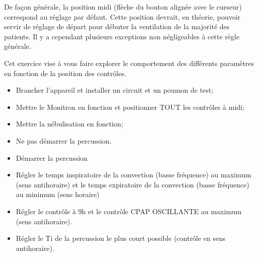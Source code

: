 \def\qpmoy{%
	Quelle est la pression (moyenne globale ou inspiratoire) affichée sur le multimètre?
	\shortanswer[\cmh]%
	}

\begin{exercice}
De façon générale, la position midi (flèche du bouton alignée avec le curseur) correspond au réglage par défaut. Cette position devrait, en théorie,  pouvoir servir de réglage de départ pour débuter la ventilation de la majorité des patients. Il y a cependant plusieurs exceptions non négligeables à cette règle générale.

Cet exercice vise à vous faire explorer le comportement des différents paramètres en fonction de la position des contrôles.

\begin{itemize}
	\item Brancher l'appareil et installer un circuit et un poumon de test;
	\item Mettre le Monitron en fonction et positionner TOUT les contrôles à midi;
	\item Mettre la nébulisation en fonction;
	\item Ne pas démarrer la percussion.
\end{itemize}




	\begin{itemize}
		\item Démarrer la percussion
		\item Régler le temps inspiratoire de la convection (basse fréquence) au maximum (sens antihoraire) et le temps expiratoire de la convection (basse fréquence) au minimum (sens horaire)
		\item Régler le contrôle  à 9h et le contrôle CPAP OSCILLANTE au maximum (sens antihoraire).
		\item Régler le Ti de la percussion le plus court possible
			(contrôle  en sens antihoraire).
	\end{itemize}

	\exsubsection{}


\end{exercice}
